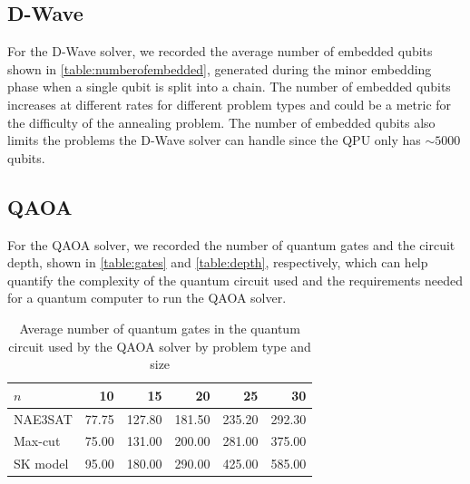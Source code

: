 \subsection{D-Wave}
For the D-Wave solver, we recorded the average number of embedded qubits shown in \autoref{table:numberofembedded}, generated during the minor embedding phase when a single qubit is split into a chain. The number of embedded qubits increases at different rates for different problem types and could be a metric for the difficulty of the annealing problem. The number of embedded qubits also limits the problems the D-Wave solver can handle since the QPU only has $\sim 5000$ qubits.
\begin{table}[!htb]
    \centering
    \caption{Average number of embedded qubits for the D-wave solver by problem type and size}
    \label{table:numberofembedded}
\end{table}
\subsection{QAOA}
For the QAOA solver, we recorded the number of quantum gates and the circuit depth, shown in \autoref{table:gates} and \autoref{table:depth}, respectively, which can help quantify the complexity of the quantum circuit used and the requirements needed for a quantum computer to run the QAOA solver.
\begin{table}[!htb]
    \centering
    \small
    \begin{tabular}{lrrrrr} \toprule
        $n$ & 10 & 15 & 20 & 25 & 30\\ \midrule
        NAE3SAT & 77.75 & 127.80 & 181.50 & 235.20 & 292.30 \\
        Max-cut & 75.00 & 131.00 & 200.00 & 281.00 & 375.00 \\
        SK model & 95.00 & 180.00 & 290.00 & 425.00 & 585.00\\ \bottomrule
    \end{tabular}
    \caption{Average number of quantum gates in the quantum circuit used by the QAOA solver by problem type and size}
    \label{table:gates}
\end{table}

